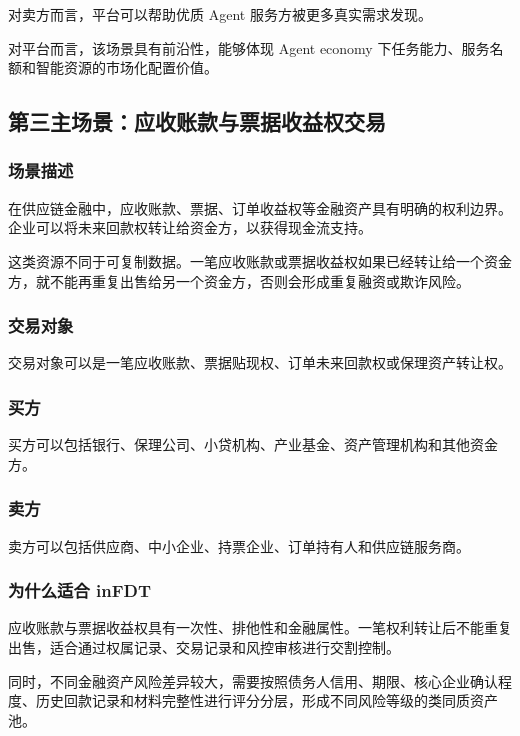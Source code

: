 \documentclass[UTF8,a4paper,12pt]{ctexart}
\begin{document}
对卖方而言，平台可以帮助优质 Agent 服务方被更多真实需求发现。

对平台而言，该场景具有前沿性，能够体现 Agent economy 下任务能力、服务名额和智能资源的市场化配置价值。

\subsection{第三主场景：应收账款与票据收益权交易}

\subsubsection*{场景描述}

在供应链金融中，应收账款、票据、订单收益权等金融资产具有明确的权利边界。企业可以将未来回款权转让给资金方，以获得现金流支持。

这类资源不同于可复制数据。一笔应收账款或票据收益权如果已经转让给一个资金方，就不能再重复出售给另一个资金方，否则会形成重复融资或欺诈风险。

\subsubsection*{交易对象}

交易对象可以是一笔应收账款、票据贴现权、订单未来回款权或保理资产转让权。

\subsubsection*{买方}

买方可以包括银行、保理公司、小贷机构、产业基金、资产管理机构和其他资金方。

\subsubsection*{卖方}

卖方可以包括供应商、中小企业、持票企业、订单持有人和供应链服务商。

\subsubsection*{为什么适合 inFDT}

应收账款与票据收益权具有一次性、排他性和金融属性。一笔权利转让后不能重复出售，适合通过权属记录、交易记录和风控审核进行交割控制。

同时，不同金融资产风险差异较大，需要按照债务人信用、期限、核心企业确认程度、历史回款记录和材料完整性进行评分分层，形成不同风险等级的类同质资产池。
\end{document}
